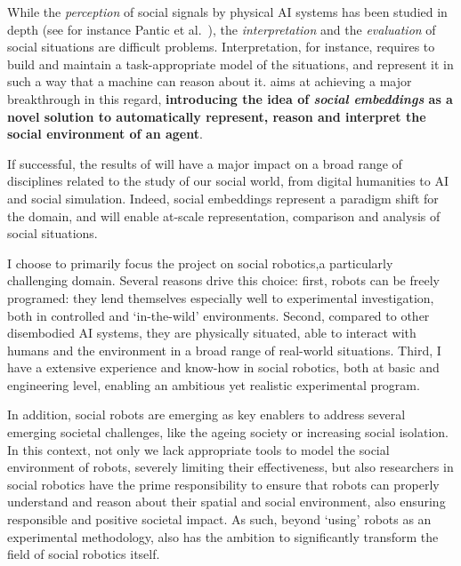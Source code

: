 While the \emph{perception} of social signals by physical AI systems has been
studied in depth (see for instance Pantic et al.~\cite{pantic2011social}), the
\emph{interpretation} and the \emph{evaluation} of social situations are
difficult problems.  Interpretation, for instance, requires to build and
maintain a task-appropriate model of the situations, and represent it in such a
way that a machine can reason about it. \project aims at achieving a major
breakthrough in this regard, \textbf{introducing the idea of \emph{social
embeddings} as a novel solution to automatically represent, reason and interpret
the social environment of an agent}.


If successful, the results of \project will have a major impact on a broad range
of disciplines related to the study of our social world, from digital humanities
to AI and social simulation. Indeed, social embeddings represent a paradigm
shift for the domain, and will enable at-scale representation, comparison and
analysis of social situations. 

I choose to primarily focus the \project project on social robotics,a particularly challenging domain. Several reasons drive this choice: first, robots can be
freely programed: they lend themselves especially well to experimental
investigation, both in controlled and `in-the-wild' environments.  Second,
compared to other disembodied AI systems, they are physically situated, able to
interact with humans and the environment in a broad range of real-world
situations. Third, I have a extensive experience and know-how in social
robotics, both at basic and engineering level, enabling an ambitious yet
realistic experimental program.

In addition, social robots are emerging as key enablers to address several
emerging societal challenges, like the ageing society or increasing social
isolation. In this context, not only we lack appropriate tools to model the
social environment of robots, severely limiting their effectiveness, but also
researchers in social robotics have the prime responsibility to ensure that
robots can properly understand and reason about their spatial and social
environment, also ensuring responsible and positive societal impact. As such,
beyond `using' robots as an experimental methodology, \project also has the
ambition to significantly transform the field of social robotics itself.

